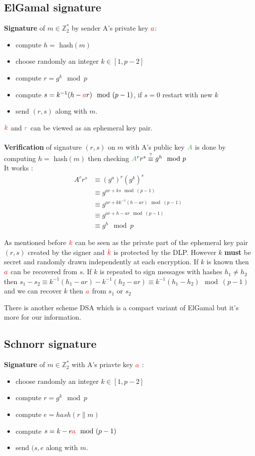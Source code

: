 \documentclass[11pt,a4paper]{report}
\newcommand{\tg}{\textcolor{ao}}
\newcommand{\tr}{\textcolor{red}}
\begin{document}
\subsection{ElGamal signature}
\textbf{Signature} of $m \in \mathbb{Z}_2^*$ by sender A's private key $\tr{a}$:
\begin{itemize}
\item compute $h =$ hash$(m)$
\item choose randomly an integer $k \in [1,p-2]$
\item compute $r = g^k \mod p$
\item compute $s = k^{-1} (h- \tr{a}r) \mod (p-1)$, if $s=0$ restart with new $k$
\item send $(r,s)$ along with $m$.
\end{itemize}
$\tr{k}$ and $\tg{r}$ can be viewed as an ephemeral key pair.\\
\\
\textbf{Verification} of signature $(r,s)$ on $m$ with A's public key $\tg{A}$ is done by computing $h =$ hash$(m)$ then checking $\tg{A}^r r^s \stackrel{?}{\equiv} g^h \mod p$\\

It works :
$$\begin{array}{rl}
A^r r^s & \equiv (g^a)^r (g^k)^s\\
& \equiv g^{ar + ks \mod (p-1)} \\
& \equiv g^{ar + kk^{-1} (h-ar) \mod (p-1)} \\
& \equiv g^{ar + h-ar \mod (p-1)} \\
& \equiv g^h \mod p
\end{array}$$

As mentioned before $\tr{k}$ can be seen as the private part of the ephemeral key pair $(r,s)$ created by the signer and $\tr{k}$ is protected by the DLP. However $k$ \textbf{must} be secret and randomly drawn independently at each encryption. If $k$ is known then $\tr{a}$ can be recovered from $s$. If $k$ is repeated to sign messages with hashes $h_1 \neq h_2$ then $s_1 - s_2 \equiv k^{-1} (h_1 - ar) - k^{-1}(h_2 - ar) \equiv k^{-1}(h_1 - h_2) \mod (p-1)$ and we can recover $k$ then $\tr{a}$ from $s_1$ or $s_2$

There is another scheme DSA which is a compact variant of ElGamal but it's more for our information.

\subsection{Schnorr signature}
\textbf{Signature} of $m \in \mathbb{Z}_2^*$ with A's priavte key $\tr{a}$ :
\begin{itemize}
\item choose randomly an integer $k \in [1,p-2]$
\item compute $r = g^k \mod p$
\item compute $e = hash(r \parallel m)$
\item compute $s = k - e\tr{a} \mod (p-1)$
\item send $(s,e$ along with $m$.
\end{itemize}
\end{document}

